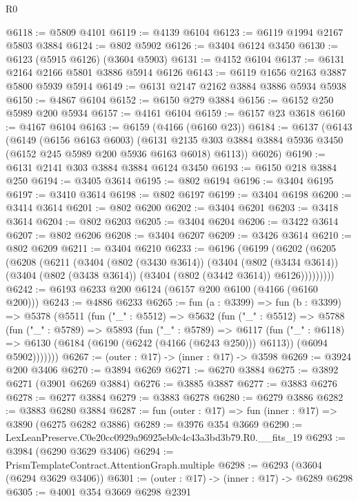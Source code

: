 \begin{lexlean}{R0}
\begin{coremodule}
@6118 := @5809 @4101
@6119 := @4139 @6104
@6123 := @6119 @1994 @2167 @5803 @3884
@6124 := @802 @5902
@6126 := @3404 @6124 @3450
@6130 := @6123 (@5915 @6126) (@3604 @5903)
@6131 := @4152 @6104
@6137 := @6131 @2164 @2166 @5801 @3886 @5914 @6126
@6143 := @6119 @1656 @2163 @3887 @5800 @5939 @5914
@6149 := @6131 @2147 @2162 @3884 @3886 @5934 @5938
@6150 := @4867 @6104
@6152 := @6150 @279 @3884
@6156 := @6152 @250 @5989 @200 @5934
@6157 := @4161 @6104
@6159 := @6157 @23 @3618
@6160 := @4167 @6104
@6163 := @6159 (@4166 (@6160 @23))
@6184 := @6137
    (@6143
      (@6149
        (@6156 @6163 @6003)
        (@6131 @2135 @303 @3884 @3884 @5936 @3450 (@6152 @245 @5989 @200 @5936 @6163 @6018) @6113))
      @6026)
@6190 := @6131 @2141 @303 @3884 @3884 @6124 @3450
@6193 := @6150 @218 @3884 @250
@6194 := @3405 @3614
@6195 := @802 @6194
@6196 := @3404 @6195
@6197 := @3410 @3614
@6198 := @802 @6197
@6199 := @3404 @6198
@6200 := @3414 @3614
@6201 := @802 @6200
@6202 := @3404 @6201
@6203 := @3418 @3614
@6204 := @802 @6203
@6205 := @3404 @6204
@6206 := @3422 @3614
@6207 := @802 @6206
@6208 := @3404 @6207
@6209 := @3426 @3614
@6210 := @802 @6209
@6211 := @3404 @6210
@6233 := @6196
    (@6199
      (@6202
        (@6205
          (@6208
            (@6211
              (@3404
                (@802 (@3430 @3614))
                (@3404
                  (@802 (@3434 @3614))
                  (@3404 (@802 (@3438 @3614)) (@3404 (@802 (@3442 @3614)) @6126)))))))))
@6242 := @6193 @6233 @200 @6124 (@6157 @200 @6100 (@4166 (@6160 @200)))
@6243 := @4886 @6233
@6265 := fun (a : @3399) =>
  fun (b : @3399) =>
  @5378
    (@5511
      (fun ("_" : @5512) =>
      @5632
        (fun ("_" : @5512) =>
        @5788
          (fun ("_" : @5789) =>
          @5893
            (fun ("_" : @5789) =>
            @6117
              (fun ("_" : @6118) =>
              @6130 (@6184 (@6190 (@6242 (@4166 (@6243 @250))) @6113)) (@6094 @5902)))))))
@6267 := (outer : @17) -> (inner : @17) -> @3598
@6269 := @3924 @200 @3406
@6270 := @3894 @6269
@6271 := @6270 @3884
@6275 := @3892 @6271 (@3901 @6269 @3884)
@6276 := @3885 @3887
@6277 := @3883 @6276
@6278 := @6277 @3884
@6279 := @3883 @6278
@6280 := @6279 @3886
@6282 := @3883 @6280 @3884
@6287 := fun (outer : @17) => fun (inner : @17) => @3890 (@6275 @6282 @3886)
@6289 := @3976 @354 @3669
@6290 := LexLeanPreserve.C0e20cc0929a96925eb0c4c43a3bd3b79.R0.__fits_19
@6293 := @3984 (@6290 @3629 @3406)
@6294 := PrismTemplateContract.AttentionGraph.multiple
@6298 := @6293 (@3604 (@6294 @3629 @3406))
@6301 := (outer : @17) -> (inner : @17) -> @6289 @6298
@6305 := @4001 @354 @3669 @6298 @2391

\end{coremodule}
\end{lexlean}
